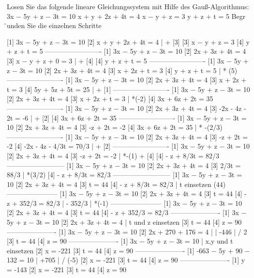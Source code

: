 Losen Sie das folgende lineare Gleichungssystem mit Hilfe des
Gauß-Algorithmus:
3x − 5y + z − 3t = 10
x + y + 2z + 4t = 4
x − y + z = 3
y + z + t = 5
Begr ̈unden Sie die einzelnen Schritte


[1]    3x − 5y + z − 3t = 10
[2]    x + y + 2z + 4t = 4     | + [3]
[3]    x − y + z = 3
[4]    y + z + t = 5
-------------------------
[1]    3x − 5y + z − 3t = 10
[2]    2x + 3z + 4t = 4
[3]    x − y + z + 0 = 3        | + [4]
[4]    y + z + t = 5
-------------------------
[1]    3x − 5y + z − 3t = 10
[2]    2x + 3z + 4t = 4
[3]    x + 2z + t = 3
[4]    y + z + t = 5           | * (5)
-------------------------
[1]    3x − 5y + z − 3t = 10
[2]    2x + 3z + 4t = 4
[3]    x + 2z + t = 3
[4]    5y + 5z + 5t = 25           | + [1]
-------------------------
[1]    3x − 5y + z − 3t = 10
[2]    2x + 3z + 4t = 4
[3]    x + 2z + t = 3              | *(-2)
[4]    3x + 6z + 2t = 35
-------------------------
[1]    3x − 5y + z − 3t = 10
[2]    2x + 3z + 4t = 4
[3]    -2x - 4z - 2t = -6           | + [2]
[4]    3x + 6z + 2t = 35
-------------------------
[1]    3x − 5y + z − 3t = 10
[2]    2x + 3z + 4t = 4
[3]    -z + 2t = -2
[4]    3x + 6z + 2t = 35       | * -(2/3)
-------------------------
[1]    3x − 5y + z − 3t = 10
[2]    2x + 3z + 4t = 4
[3]    -z + 2t = -2
[4]    -2x - 4z - 4/3t = 70/3     | + [2]
-------------------------
[1]    3x − 5y + z − 3t = 10
[2]    2x + 3z + 4t = 4
[3]    -z + 2t = -2            | *-(1) + [4]
[4]    - z + 8/3t = 82/3
--------------------------
[1]    3x − 5y + z − 3t = 10
[2]    2x + 3z + 4t = 4
[3]    2/3t = 88/3            | *(3/2)
[4]    - z + 8/3t = 82/3
--------------------------
[1]    3x − 5y + z − 3t = 10
[2]    2x + 3z + 4t = 4
[3]    t = 44
[4]    - z + 8/3t = 82/3      | t einsetzen (44)
-----------------------
[1]    3x − 5y + z − 3t = 10
[2]    2x + 3z + 4t = 4
[3]    t = 44
[4]    - z + 352/3 = 82/3     | - 352/3 | *(-1)
-----------------------
[1]    3x − 5y + z − 3t = 10
[2]    2x + 3z + 4t = 4
[3]    t = 44
[4]    - z + 352/3 = 82/3
----------------------
[1]    3x − 5y + z − 3t = 10
[2]    2x + 3z + 4t = 4      | t und z einsetzen
[3]    t = 44
[4]    z = 90
----------------------
[1]    3x − 5y + z − 3t = 10
[2]    2x + 270 + 176 = 4      | | -446 | / 2
[3]    t = 44
[4]    z = 90
----------------------
[1]    3x − 5y + z − 3t = 10    | x,y und t einsetzen
[2]    x = -221
[3]    t = 44
[4]    z = 90
----------------------
[1]    -663 − 5y + 90 − 132 = 10 | +705 | / (-5)
[2]    x = -221
[3]    t = 44
[4]    z = 90
----------------------
[1]    y = -143
[2]    x = -221
[3]    t = 44
[4]    z = 90

